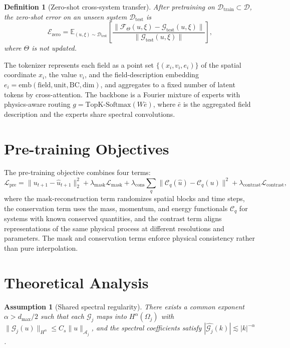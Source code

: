 \documentclass[preprint,12pt]{elsarticle}
\newtheorem{definition}{Definition}
\newtheorem{assumption}{Assumption}
\begin{document}
\begin{definition}[Zero-shot cross-system transfer]
After pretraining on $\mathcal{D}_{\mathrm{train}}\subset\mathcal{D}$, the zero-shot error on an unseen system $\mathcal{D}_{\mathrm{test}}$ is
\begin{equation}
\mathcal{E}_{\mathrm{zero}}=
\mathbb{E}_{(u,\xi)\sim\mathcal{D}_{\mathrm{test}}}
\left[\frac{\|\mathcal{F}_\Theta(u,\xi)-\mathcal{G}_{\mathrm{test}}(u,\xi)\|}
{\|\mathcal{G}_{\mathrm{test}}(u,\xi)\|}\right],
\end{equation}
where $\Theta$ is not updated.
\end{definition}

The tokenizer represents each field as a point set $\{(x_i,v_i,e_i)\}$ of the spatial coordinate $x_i$, the value $v_i$, and the field-description embedding $e_i=\mathrm{emb}(\text{field},\text{unit},\text{BC},\text{dim})$, and aggregates to a fixed number of latent tokens by cross-attention. The backbone is a Fourier mixture of experts with physics-aware routing $g=\mathrm{TopK}\text{-Softmax}(W\bar e)$, where $\bar e$ is the aggregated field description and the experts share spectral convolutions.

\section{Pre-training Objectives}
The pre-training objective combines four terms:
\begin{equation}
\mathcal{L}_{\mathrm{pre}}=\|u_{t+1}-\hat u_{t+1}\|_2^2+\lambda_{\mathrm{mask}}\mathcal{L}_{\mathrm{mask}}+\lambda_{\mathrm{cons}}\sum_q\|\mathcal{C}_q(\hat u)-\mathcal{C}_q(u)\|^2+\lambda_{\mathrm{contrast}}\mathcal{L}_{\mathrm{contrast}},
\end{equation}
where the mask-reconstruction term randomizes spatial blocks and time steps, the conservation term uses the mass, momentum, and energy functionals $\mathcal{C}_q$ for systems with known conserved quantities, and the contrast term aligns representations of the same physical process at different resolutions and parameters. The mask and conservation terms enforce physical consistency rather than pure interpolation.

\section{Theoretical Analysis}
\begin{assumption}[Shared spectral regularity]
There exists a common exponent $\alpha>d_{\max}/2$ such that each $\mathcal{G}_j$ maps into $H^{\alpha}(\Omega_j)$ with $\|\mathcal{G}_j(u)\|_{H^{\alpha}}\le C_s\|u\|_{\mathcal{A}_j}$, and the spectral coefficients satisfy $|\hat{\mathcal{G}_j}(k)|\lesssim|k|^{-\alpha}$.
\end{assumption}
\end{document}
